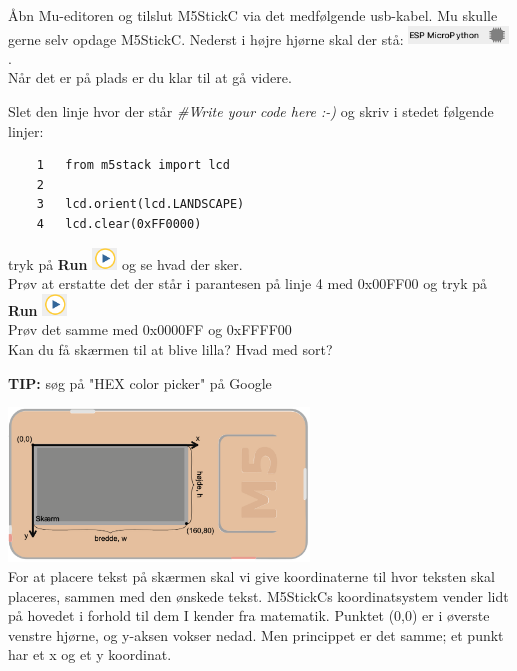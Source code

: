 \documentclass{ucph-handout}
\newcounter{handout}
\newcommand{\Ark}{Ark \#\arabic{handout} -- }
\begin{document}
\renewcommand{\Title}{\Ark LCD skærmen}

\begin{exercisebox}[adjusted title=De første skridt]
Åbn Mu-editoren og tilslut M5StickC via det medfølgende usb-kabel. Mu skulle gerne selv opdage M5StickC. Nederst i højre hjørne skal der stå: \includegraphics[width=0.20\textwidth]{ikoner/det.png}.\\ Når det er på plads er du klar til at gå videre.


Slet den linje hvor der står \textit{\#Write your code here :-)} og skriv i stedet følgende linjer:

\begin{verbatim}
    1   from m5stack import lcd
    2
    3   lcd.orient(lcd.LANDSCAPE)
    4   lcd.clear(0xFF0000)
\end{verbatim}

tryk på \textbf{Run} \includegraphics[width=0.05\textwidth]{ikoner/run.png} og se hvad der sker. \\

Prøv at erstatte det der står i parantesen på linje 4 med 0x00FF00 og tryk på \textbf{Run} \includegraphics[width=0.05\textwidth]{ikoner/run.png}\\ 
Prøv det samme med 0x0000FF og 0xFFFF00\\

Kan du få skærmen til at blive lilla? Hvad med sort?

\textbf{TIP:} søg på "HEX color picker" på Google

\vspace{3mm}
\includegraphics[width=0.6\textwidth]{billeder/landskabeorient.png}\\
For at placere tekst på skærmen skal vi give koordinaterne til hvor teksten skal placeres, sammen med den ønskede tekst. M5StickCs koordinatsystem vender lidt på hovedet i forhold til dem I kender fra matematik. Punktet (0,0) er i øverste venstre hjørne, og y-aksen vokser nedad. Men princippet er det samme; et punkt har et x og et y koordinat. \\


\end{exercisebox}
\end{document}
